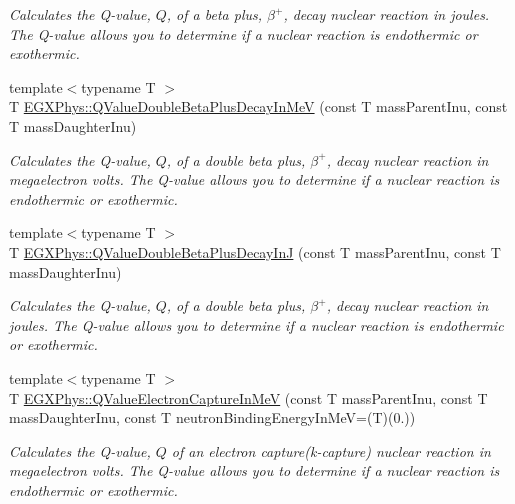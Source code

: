\begin{DoxyCompactItemize}
\begin{DoxyCompactList}\small\item\em Calculates the Q-\/value, $Q$, of a beta plus, $\beta^+$, decay nuclear reaction in joules. The Q-\/value allows you to determine if a nuclear reaction is endothermic or exothermic. \end{DoxyCompactList}\item 
{\footnotesize template$<$typename T $>$ }\\T \mbox{\hyperlink{group___e_g_x_phys-_q_value-_beta_plus_gab78be314eac63ddbce441b4c8b22b47d}{E\+G\+X\+Phys\+::\+Q\+Value\+Double\+Beta\+Plus\+Decay\+In\+MeV}} (const T mass\+Parent\+Inu, const T mass\+Daughter\+Inu)
\begin{DoxyCompactList}\small\item\em Calculates the Q-\/value, $Q$, of a double beta plus, $\beta^+$, decay nuclear reaction in megaelectron volts. The Q-\/value allows you to determine if a nuclear reaction is endothermic or exothermic. \end{DoxyCompactList}\item 
{\footnotesize template$<$typename T $>$ }\\T \mbox{\hyperlink{group___e_g_x_phys-_q_value-_beta_plus_ga3531ffda0c561a601a61f54f5c7780df}{E\+G\+X\+Phys\+::\+Q\+Value\+Double\+Beta\+Plus\+Decay\+InJ}} (const T mass\+Parent\+Inu, const T mass\+Daughter\+Inu)
\begin{DoxyCompactList}\small\item\em Calculates the Q-\/value, $Q$, of a double beta plus, $\beta^+$, decay nuclear reaction in joules. The Q-\/value allows you to determine if a nuclear reaction is endothermic or exothermic. \end{DoxyCompactList}\item 
{\footnotesize template$<$typename T $>$ }\\T \mbox{\hyperlink{group___e_g_x_phys-_q_value-_electron_capture_ga9cd8502b6101614c17114e9710cdcf6c}{E\+G\+X\+Phys\+::\+Q\+Value\+Electron\+Capture\+In\+MeV}} (const T mass\+Parent\+Inu, const T mass\+Daughter\+Inu, const T neutron\+Binding\+Energy\+In\+MeV=(T)(0.))
\begin{DoxyCompactList}\small\item\em Calculates the Q-\/value, $Q$ of an electron capture(k-\/capture) nuclear reaction in megaelectron volts. The Q-\/value allows you to determine if a nuclear reaction is endothermic or exothermic. \end{DoxyCompactList}\item 

\end{DoxyCompactItemize}
